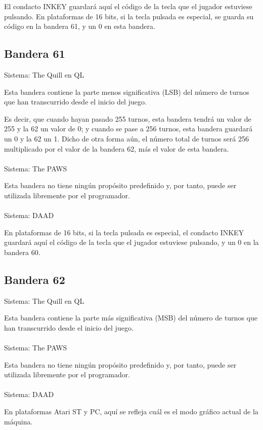 \documentclass[11pt, a5paper]{article}
\newcommand{\quill}{\textsf{The Quill}\xspace}
\newcommand{\paw}{\textsf{The PAWS}\xspace}
\newcommand{\daad}{\textsf{DAAD}\xspace}
\newcommand{\sistema}[1]{\noindent Sistema: #1 \nopagebreak}
\begin{document}
El condacto INKEY guardará aquí el código de la tecla que el jugador estuviese pulsando. En plataformas de 16 bits, si la tecla pulsada es especial, se guarda su código en la bandera 61, y un 0 en esta bandera. \cite[págs. 25, 61 y 62]{DAAD}

\subsection{Bandera 61}\label{flag61}

\sistema{\quill en QL}

Esta bandera contiene la parte menos significativa (LSB) del número de turnos que han transcurrido desde el inicio del juego.

Es decir, que cuando hayan pasado 255 turnos, esta bandera tendrá un valor de 255 y la 62 un valor de 0; y cuando se pase a 256 turnos, esta bandera guardará un 0 y la 62 un 1. Dicho de otra forma aún, el número total de turnos será 256 multiplicado por el valor de la bandera 62, más el valor de esta bandera.
\\\ \\
\sistema{\paw}

Esta bandera no tiene ningún propósito predefinido y, por tanto, puede ser utilizada libremente por el programador.
\\\ \\
\sistema{\daad}

En plataformas de 16 bits, si la tecla pulsada es especial, el condacto INKEY guardará aquí el código de la tecla que el jugador estuviese pulsando, y un 0 en la bandera 60. \cite[págs. 25, 61 y 62]{DAAD}

\subsection{Bandera 62}

\sistema{\quill en QL}

Esta bandera contiene la parte más significativa (MSB) del número de turnos que han transcurrido desde el inicio del juego.
\\\ \\
\sistema{\paw}

Esta bandera no tiene ningún propósito predefinido y, por tanto, puede ser utilizada libremente por el programador.
\\\ \\
\sistema{\daad}

En plataformas Atari ST y PC, aquí se refleja cuál es el modo gráfico actual de la máquina. \cite[pág. 62]{DAAD}
\end{document}
